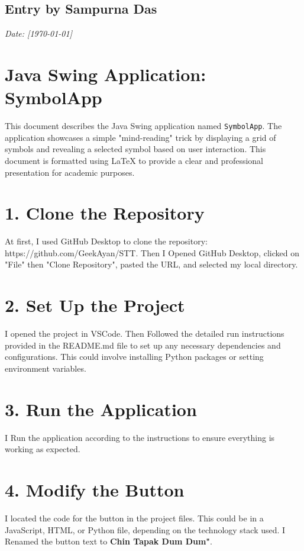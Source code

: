 \documentclass[12pt, a4paper]{article}
\begin{document}
\newpage
{}
\vspace{-2cm}
\subsection*{Entry by Sampurna Das}
\textit{Date: [\today]}\\
\section*{Java Swing Application: SymbolApp}
This document describes the Java Swing application named \texttt{SymbolApp}. The application showcases a simple "mind-reading" trick by displaying a grid of symbols and revealing a selected symbol based on user interaction. This document is formatted using LaTeX to provide a clear and professional presentation for academic purposes.

\section*{ 1. Clone the Repository}
At first, I used GitHub Desktop to clone the repository: https://github.com/GeekAyan/STT.
Then I Opened GitHub Desktop, clicked on "File" then "Clone Repository", pasted the URL, and selected my local directory.

\section*{  2. Set Up the Project}
I opened the project in VSCode.
Then Followed the detailed run instructions provided in the README.md file to set up any necessary dependencies and configurations. This could involve installing Python packages or setting environment variables.

\section*{ 3. Run the Application}
I Run the application according to the instructions to ensure everything is working as expected.

\section*{ 4. Modify the Button}
I located the code for the button in the project files. This could be in a JavaScript, HTML, or Python file, depending on the technology stack used.
I Renamed the button text to \textbf{Chin Tapak Dum Dum"}.
  
\end{document}
